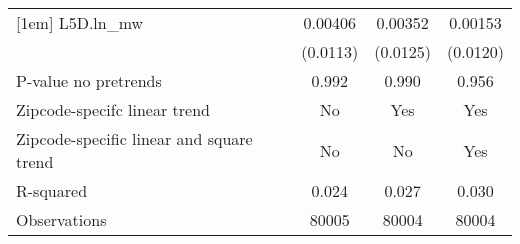 {\begin{tabular}{l*{3}{c}}
[1em]
L5D.ln\_mw &  0.00406         &  0.00352         &  0.00153         \\
          & (0.0113)         & (0.0125)         & (0.0120)         \\
\hline
P-value no pretrends&    0.992         &    0.990         &    0.956         \\
Zipcode-specifc linear trend&       No         &      Yes         &      Yes         \\
Zipcode-specific linear and square trend&       No         &       No         &      Yes         \\
R-squared &    0.024         &    0.027         &    0.030         \\
Observations&    80005         &    80004         &    80004         \\
\hline\hline
\end{tabular}
}
